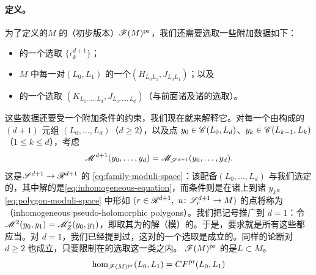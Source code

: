 \paragraph{定义。}\label{sub:the-definition}
为了定义\trCorneredBoundary{}的\trExactSymplectic\trManifold{}$M$ 的\trFukayaCategory{}（初步版本）$\mathscr{F}(M)^{\mathrm{pr}}$，我们还需要选取一些附加数据如下：
\begin{itemize}
\item \trStriplikeEnd{}的一个\trConsistent\trUniversal{}选取 $\{\epsilon^{d+1}_k\}$；
\item $M$ 中每一对\trExact\trLagrange\trSubmanifold{}$(L_0,L_1)$ 的一个\trFloerDatum{}$(H_{L_0L_1},J_{L_0L_1})$；以及
\item \trPerturbationDatum{}的一个\trConsistent\trUniversal{}选取 $(K_{L_0,\ldots,L_d},J_{L_0,\ldots,L_d})$（与前面诸\trStriplikeEnd{}及诸\trFloerDatum{}的选取\trCompatible）。
\end{itemize}
这些数据还要受一个附加\trRegularity{}条件的约束，我们现在就来解释它。对每一个由\trExact\trLagrange\trSubmanifold{}构成的 $(d{+}1)$ 元组 $(L_0,\ldots,L_d)$（$d\ge 2$），以及点 $y_0\in\mathscr{C}(L_0,L_d)$、$y_k\in\mathscr{C}(L_{k-1},L_k)$（$1\le k\le d$），考虑
\begin{equation}\label{eq:polygon-moduli-space}
\mathscr{M}^{d+1}(y_0,\ldots,y_d)=\mathscr{M}_{\mathscr{S}^{d+1}}(y_0,\ldots,y_d).
\end{equation}
这是\trFamily{}$\mathscr{S}^{d+1}\to\mathscr{R}^{d+1}$ 的\trModuliSpace{} \eqref{eq:family-moduli-space}：该\trFamily{}配备\trLagrange\trLabel{}$(L_0,\ldots,L_d)$ 与我们选定的\trPerturbationDatum，其中解的是\eqref{eq:inhomogeneous-equation}，而\trAsymptotic{}条件则是在诸\trStriplikeEnd{}上\trConvergence{}到诸 $y_k$。\eqref{eq:polygon-moduli-space} 中形如 $(r\in\scr{R}^{d+1},\ u\colon\scr{S}^{d+1}_r\to M)$ 的点将称为\textbf{\trInhomogeneous\trPseudoholomorphic\trPolygon}（inhomogeneous pseudo-holomorphic polygons）。我们把记号推广到 $d=1$：令 $\mathscr{M}^2(y_0,y_1)=\mathscr{M}^*_Z(y_0,y_1)$，即取其为\trFloerEquation{}的解（模\trTranslation）的\trModuliSpace。于是，要求就是所有这些\trModuliSpace{}都应当\trRegular。对 $d=1$，我们已经提到过，这对\trFloerDatum{}的一个\trGeneric{}选取是成立的。同样的论断对 $d\ge 2$ 也成立，只要限制在\trConsistent{}的\trPerturbationDatum\trUniversal{}选取这一类之内。
$\mathscr{F}(M)^{\mathrm{pr}}$ 的\trObject{}是\trExact\trLagrange\trSubmanifold{}$L\subset M$。\trMorphism
\begin{equation*}
\hom_{\mathscr{F}(M)^{\mathrm{pr}}}(L_0,L_1)=CF^{\mathrm{pr}}(L_0,L_1)
\end{equation*}
